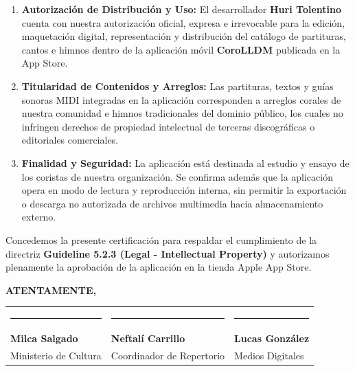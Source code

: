 \documentclass[11pt,letterpaper]{article}
\begin{document}
\begin{enumerate}
    \item \textbf{Autorización de Distribución y Uso:} El desarrollador \textbf{Huri Tolentino} cuenta con nuestra autorización oficial, expresa e irrevocable para la edición, maquetación digital, representación y distribución del catálogo de partituras, cantos e himnos dentro de la aplicación móvil \textbf{CoroLLDM} publicada en la App Store.
    
    \item \textbf{Titularidad de Contenidos y Arreglos:} Las partituras, textos y guías sonoras MIDI integradas en la aplicación corresponden a arreglos corales de nuestra comunidad e himnos tradicionales del dominio público, los cuales no infringen derechos de propiedad intelectual de terceras discográficas o editoriales comerciales.
    
    \item \textbf{Finalidad y Seguridad:} La aplicación está destinada al estudio y ensayo de los coristas de nuestra organización. Se confirma además que la aplicación opera en modo de lectura y reproducción interna, sin permitir la exportación o descarga no autorizada de archivos multimedia hacia almacenamiento externo.
\end{enumerate}

\vspace{0.3cm}
\noindent Concedemos la presente certificación para respaldar el cumplimiento de la directriz \textbf{Guideline 5.2.3 (Legal - Intellectual Property)} y autorizamos plenamente la aprobación de la aplicación en la tienda Apple App Store.

\vspace{0.8cm}

\noindent \textbf{ATENTAMENTE,}

\vspace{1.2cm}

\begin{table}[h!]
\centering
\begin{tabularx}{\textwidth}{X X X}
\centering \rule{4.5cm}{0.4pt} & \centering \rule{4.5cm}{0.4pt} & \centering \rule{4.5cm}{0.4pt} \tabularnewline
\centering \textbf{Milca Salgado} & \centering \textbf{Neftalí Carrillo} & \centering \textbf{Lucas González} \tabularnewline
\centering \small Ministerio de Cultura & \centering \small Coordinador de Repertorio & \centering \small Medios Digitales \tabularnewline
\end{tabularx}
\end{table}
\end{document}
